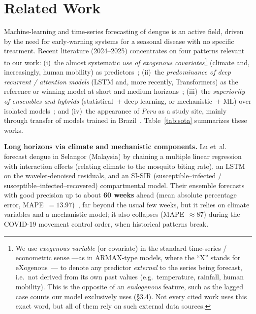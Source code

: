 \documentclass[runningheads]{llncs}
\begin{document}
\section{Related Work}
Machine-learning and time-series forecasting of dengue is an active field, driven by the
need for early-warning systems for a seasonal disease with no specific treatment. Recent
literature (2024--2025) concentrates on four patterns relevant to our work:
(i)~the almost systematic \emph{use of exogenous covariates}\footnote{We use \emph{exogenous
variable} (or covariate) in the standard time-series / econometric sense ---as in
ARMAX-type models, where the ``X'' stands for eXogenous~\cite{boxjenkins,hyndmanFPP}--- to
denote any predictor \emph{external} to the series being forecast, i.e.\ not derived from
its own past values (e.g.\ temperature, rainfall, human mobility). This is the opposite of an
\emph{endogenous} feature, such as the lagged case counts our model exclusively uses (\S3.4).
Not every cited work uses this exact word, but all of them rely on such external data
sources.} (climate and, increasingly,
human mobility) as predictors~\cite{lu2025,chen2025rio,sebastianelli2024,chen2025mobility,
dhaked2025,tft2026}; (ii)~the \emph{predominance of deep recurrent / attention models}
(LSTM and, more recently, Transformers) as the reference or winning model at short and
medium horizons~\cite{chen2025rio,chen2025mobility,dhaked2025,tft2026}; (iii)~the
\emph{superiority of ensembles and hybrids} (statistical~$+$ deep learning, or
mechanistic~$+$ ML) over isolated models~\cite{lu2025,chen2025rio,sebastianelli2024};
and (iv)~the appearance of \emph{Peru} as a study site, mainly through transfer of models
trained in Brazil~\cite{sebastianelli2024}. Table~\ref{tab:sota} summarizes these works.

\textbf{Long horizons via climate and mechanistic components.}
Lu et~al.~\cite{lu2025} forecast dengue in Selangor (Malaysia) by chaining a multiple
linear regression with interaction effects (relating climate to the mosquito biting rate),
an LSTM on the wavelet-denoised residuals, and an SI-SIR (susceptible--infected /
susceptible--infected--recovered) compartmental model. Their
ensemble forecasts with good precision up to about \textbf{60 weeks} ahead
(mean absolute percentage error, MAPE~$=13.97$)~\cite{hyndman2006}, far beyond the usual
few weeks, but it relies on climate variables and a
mechanistic model; it also collapses (MAPE~$\approx87$) during the COVID-19 movement
control order, when historical patterns break.
\end{document}
